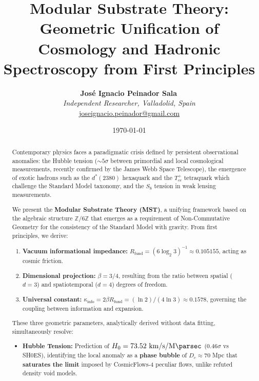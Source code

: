 \documentclass[11pt, a4paper]{article}
\title{\textbf{Modular Substrate Theory: \\ Geometric Unification of Cosmology and Hadronic Spectroscopy from First Principles}}
\author{
  \textbf{José Ignacio Peinador Sala}\,\orcidlink{0009-0008-1822-3452} \\
  \textit{Independent Researcher, Valladolid, Spain} \\
  \small\href{mailto:joseignacio.peinador@gmail.com}{joseignacio.peinador@gmail.com}
}
\date{\today}
\theoremstyle{plain}
\theoremstyle{definition}
\newcommand{\Rfactor}{R_{\text{fund}}}
\newcommand{\Kinfo}{\kappa_{\text{info}}}
\begin{document}
\maketitle


\begin{abstract}
\noindent
Contemporary physics faces a paradigmatic crisis defined by persistent observational anomalies: the Hubble tension ($\sim 5\sigma$ between primordial and local cosmological measurements, recently confirmed by the James Webb Space Telescope), the emergence of exotic hadrons such as the $d^*(2380)$ hexaquark and the $T_{cc}^+$ tetraquark which challenge the Standard Model taxonomy, and the $S_8$ tension in weak lensing measurements.

We present the \textbf{Modular Substrate Theory (MST)}, a unifying framework based on the algebraic structure $\mathbb{Z}/6\mathbb{Z}$ that emerges as a requirement of Non-Commutative Geometry for the consistency of the Standard Model with gravity. From first principles, we derive:

\begin{enumerate}
    \item \textbf{Vacuum informational impedance:} $\Rfactor = (6\log_2 3)^{-1} \approx 0.105155$, acting as cosmic friction.
    
    \item \textbf{Dimensional projection:} $\beta = 3/4$, resulting from the ratio between spatial ($d=3$) and spatiotemporal ($d=4$) degrees of freedom.
    
    \item \textbf{Universal constant:} $\Kinfo = 2\beta\Rfactor = (\ln 2)/(4\ln 3) \approx 0.1578$, governing the coupling between information and expansion.
\end{enumerate}

These three geometric parameters, analytically derived without data fitting, simultaneously resolve:

\begin{itemize}
    \item \textbf{Hubble Tension:} Prediction of $H_0 = 73.52\ \si{\kilo\meter\per\second\per\mega\parsec}$ ($0.46\sigma$ vs SH0ES), identifying the local anomaly as a \textbf{phase bubble} of $D_c \approx 70$ Mpc that \textbf{saturates the limit} imposed by CosmicFlows-4 peculiar flows, unlike refuted density void models.
    

\end{itemize}
\end{abstract}
\end{document}
